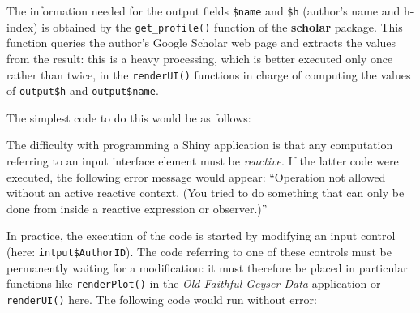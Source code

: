 \documentclass[
  12pt,
  american,
  a4paper,
  extrafontsizes,onecolumn,openright
  ]{memoir}
\newenvironment{Shaded}{\begin{snugshade}}{\end{snugshade}}
\newcommand{\CommentTok}[1]{\textcolor[rgb]{0.56,0.35,0.01}{\textit{#1}}}
\newcommand{\FunctionTok}[1]{\textcolor[rgb]{0.13,0.29,0.53}{\textbf{#1}}}
\newcommand{\NormalTok}[1]{#1}
\newcommand{\OtherTok}[1]{\textcolor[rgb]{0.56,0.35,0.01}{#1}}
\newcommand{\SpecialCharTok}[1]{\textcolor[rgb]{0.81,0.36,0.00}{\textbf{#1}}}
\newlength{\rf}
\begin{document}
\begin{Shaded}
\end{Shaded}

\normalsize

The information needed for the output fields \texttt{\$name} and \texttt{\$h} (author's name and h-index) is obtained by the \texttt{get\_profile()} function of the \textbf{scholar} package.
This function queries the author's Google Scholar web page and extracts the values from the result: this is a heavy processing, which is better executed only once rather than twice, in the \texttt{renderUI()} functions in charge of computing the values of \texttt{output\$h} and \texttt{output\$name}.

The simplest code to do this would be as follows:

\scriptsize

\begin{Shaded}
\end{Shaded}

\normalsize

The difficulty with programming a Shiny application is that any computation referring to an input interface element must be \emph{reactive}.
If the latter code were executed, the following error message would appear:
\enquote{Operation not allowed without an active reactive context. (You tried to do something that can only be done from inside a reactive expression or observer.)}

In practice, the execution of the code is started by modifying an input control (here: \texttt{intput\$AuthorID}).
The code referring to one of these controls must be permanently waiting for a modification: it must therefore be placed in particular functions like \texttt{renderPlot()} in the \emph{Old Faithful Geyser Data} application or \texttt{renderUI()} here.
The following code would run without error:

\scriptsize
\end{document}
